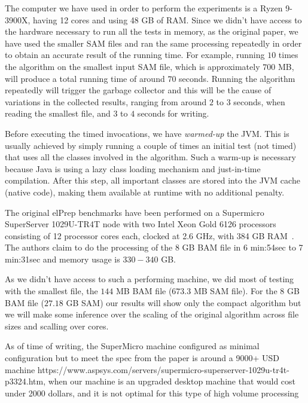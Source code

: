\documentclass[a4paper,twoside]{article}
\begin{document}
The computer we have used in order to perform the experiments is a Ryzen 9-3900X, having 12 cores and using 48 GB of RAM\@.
Since we didn't have access to the hardware necessary to run all the tests in memory, as the original paper, we have used the smaller SAM files and ran the same processing repeatedly in order to obtain an accurate result of the running time.
For example, running $10$ times the algorithm on the smallest input SAM file, which is approximately $700$ MB, will produce a total running time of around $70$ seconds. 
Running the algorithm repeatedly will trigger the garbage collector and this will be the cause of variations in the collected results, ranging from around $2$ to $3$ seconds, when reading the smallest file, and $3$ to $4$ seconds for writing.

Before executing the timed invocations, we have {\textit{warmed-up} } the JVM\@.
This is usually achieved by simply running a couple of times an initial test (not timed) that uses all the classes involved in the algorithm.
Such a warm-up is necessary because Java is using a lazy class loading mechanism and just-in-time compilation.
After this step, all important classes are stored into the JVM cache (native code), making them available at runtime with no additional penalty.

The original elPrep benchmarks have been performed on a Supermicro SuperServer 1029U-TR4T node with two
Intel Xeon Gold 6126 processors consisting of 12 processor cores each, clocked at 2.6 GHz, with 384 GB RAM~\cite{costanza:2019}.
The authors claim to do the processing of the 8 GB BAM file in 6 min:54sec to 7 min:31sec and memory usage is $330-340$ GB\@.

As we didn't have access to such a performing machine, we did most of testing with the smallest file, the $144$ MB BAM file ($673.3$ MB SAM file).
For the $8$ GB BAM file ($27.18$ GB SAM) our results will show only the compact algorithm but we will make some inference over the scaling of the original algorithm across file sizes and scalling over cores.

As of time of writing, the SuperMicro machine configured as minimal configuration but to meet the spec from the paper is around a 9000+ USD machine https://www.aspsys.com/servers/supermicro-superserver-1029u-tr4t-p3324.htm, when our machine is an upgraded desktop machine that would cost under 2000 dollars, and it is not optimal for this type of high volume processing
\end{document}
